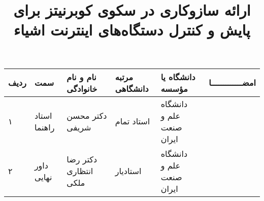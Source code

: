 \subject{مهندسی کامپیوتر}
\title{ارائه سازوکاری در سکوی کوبرنیتز برای پایش و کنترل دستگاه‌های اینترنت اشیاء}


\firstPage
\davaranPage

\begin{center}
    \begin{tabular}{| p{8mm} | p{18mm} | p{} |p{14mm}|p{}|c|}
        \hline
        ردیف & سمت          & نام و نام خانوادگی           & مرتبه \newline دانشگاهی & دانشگاه یا مؤسسه                  & امضـــــــــــــا \\
        \hline
        ۱    & استاد راهنما & دکتر \newline محسن شریفی & استاد تمام                 & دانشگاه \newline علم و صنعت ایران &                   \\
        \hline
        ۲    & داور نهایی   & دکتر \newline  رضا انتظاری ملکی        & استادیار                 & دانشگاه \newline علم و صنعت ایران &                   \\
        \hline
    \end{tabular}
\end{center}

